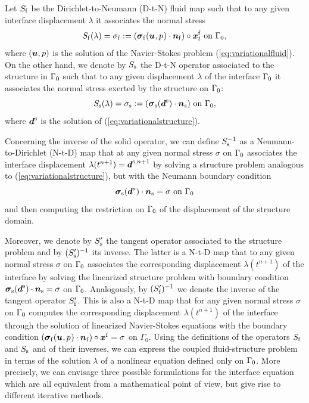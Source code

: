 Let $S_{\mathrm{f}}$ be the Dirichlet-to-Neumann (D-t-N) fluid map such that to any given interface
displacement $\lambda$ it associates the normal stress
$$
S_{\mathrm{f}} (\lambda) = \sigma_{\mathrm{f}} :=  (\boldsymbol{\sigma}_{\mathrm{f}} ({\boldsymbol{u}}^{{ }}, p^{{ }}) \cdot {\boldsymbol{n}}_{\mathrm{f}}) \circ {\boldsymbol{x}^{\mathrm{f}}_{t}} \mbox{ on } \Gamma_0,
$$
where $({\boldsymbol{u}}, p)$ is the solution of the Navier-Stokes problem (\ref{eq:variationalfluid}). On the
other hand, we denote by $S_{\mathrm{s}}$ the D-t-N operator associated to the structure in $\Gamma_0$ such
that to any given displacement $\lambda$ of the interface $\Gamma_0$ it associates the normal stress
exerted by the structure on $\Gamma_0$:
$$
S_{\mathrm{s}} (\lambda) = \sigma_{\mathrm{s}} :=  (\boldsymbol{\sigma}_{\mathrm{s}}({\boldsymbol{d}^{\mathrm{s}}}) \cdot {\boldsymbol{n}}_{\mathrm{s}}) \mbox{ on } \Gamma_0,
$$
where ${\boldsymbol{d}^{\mathrm{s}}}$ is the solution of (\ref{eq:variationalstructure}).

Concerning the inverse of the solid operator, we can define $S_{\mathrm{s}}^{-1}$ as a Neumann-to-Dirichlet
(N-t-D) map that at any given normal stress $\sigma$ on $\Gamma_0$ associates the interface
displacement $\lambda(t^{n+1}) = {\boldsymbol{d}}^{{\mathrm{s}},n+1}$ by solving a structure problem analogous to
(\ref{eq:variationalstructure}), but with the Neumann boundary condition
\begin{equation*}
\boldsymbol{\sigma}_{\mathrm{s}}({\boldsymbol{d}}^s) \cdot\boldsymbol{n}_{\mathrm{s}} = \sigma \textrm{ on } \Gamma_0
\end{equation*}
and then computing the restriction on $\Gamma_0$ of the displacement of
the structure domain.

Moreover, we denote by $S_{\mathrm{s}}'$ the tangent operator associated to the structure problem and by
$(S_{\mathrm{s}}')^{-1}$ its inverse. The latter is a N-t-D map that to any given normal stress $\sigma$ on
$\Gamma_0$ associates the corresponding displacement $\lambda(t^{n+1})$ of the interface by solving
the linearized structure problem with boundary condition $\boldsymbol{\sigma}_{\mathrm{s}} ({\boldsymbol{d}^{\mathrm{s}}}) \cdot \boldsymbol{n}_{\mathrm{s}} = \sigma$ on $\Gamma_0$. Analogously, by $(S_{\mathrm{f}}')^{-1}$ we denote the inverse of the tangent
operator $S_{\mathrm{f}}'$. This is also a N-t-D map  that for any given normal stress $\sigma$ on $\Gamma_0$
computes the corresponding displacement $\lambda(t^{n+1})$ of the interface through the solution of
linearized Navier-Stokes equations with the boundary condition $(\boldsymbol{\sigma}_{\mathrm{f}} ({\boldsymbol{u}}^{{ }}, p^{{ }}) \cdot {\boldsymbol{n}}_{\mathrm{f}}) \circ
\boldsymbol{x}^{{\mathrm{f}}} = \sigma$ on $\Gamma_0$.
Using the definitions of the operators $S_{\mathrm{f}}$ and $S_{\mathrm{s}}$ and of their inverses, we can express the
coupled fluid-structure problem in terms of the solution $\lambda$ of a nonlinear equation defined
only on $\Gamma_0$. More precisely, we can envisage three possible formulations for the interface
equation which are all equivalent from a mathematical point of view, but give rise to different
iterative methods.

